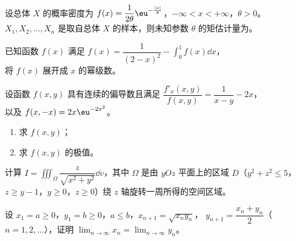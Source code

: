 \begin{question}[index=16]
设总体 $X$ 的概率密度为 $f(x)=\dfrac{1}{2\theta}\eu^{-\frac{|x|}{\theta}}$，$-\infty<x<+\infty$，$\theta>0$。
$X_1,X_2,\ldots,X_n$ 是取自总体 $X$ 的样本，则未知参数 $\theta$ 的矩估计量为\fillin。
\end{question}

\solveheading

\begin{question}[index=17,points=10,show-points=true,points-prelabel={（本题满分},points-postlabel={分）},points-separate-par=false]
已知函数 $f(x)$ 满足 $f(x)=\dfrac{1}{(2-x)^2}-\displaystyle\int_0^1 f(x)\dd x$，\\
将 $f(x)$ 展开成 $x$ 的幂级数。
\end{question}

\begin{question}[index=18,points=12,show-points=true,points-prelabel={（本题满分},points-postlabel={分）},points-separate-par=false]
设函数 $f(x,y)$ 具有连续的偏导数且满足 $\dfrac{f'_x(x,y)}{f(x,y)}=\dfrac{1}{x-y}-2x$，\\
以及 $f(x,-x)=2x\eu^{-2x^2}$。
\begin{enumerate}[label=（\Roman*）,leftmargin=2.6em,labelsep=.4em,itemsep=3pt,topsep=3pt]
\item 求 $f(x,y)$；
\item 求 $f(x,y)$ 的极值。
\end{enumerate}
\end{question}

\begin{question}[index=19,points=12,show-points=true,points-prelabel={（本题满分},points-postlabel={分）},points-separate-par=false]
计算 $I=\displaystyle\iiint_{\Omega}\dfrac{z}{\sqrt{x^2+y^2}}\dd v$，其中 $\Omega$ 是由 $yOz$ 平面上的区域 $D$（$y^2+z^2\le 5$，$z\ge y-1$，$y\ge 0$，$z\ge 0$）绕 $z$ 轴旋转一周所得的空间区域。
\end{question}

\begin{question}[index=20,points=12,show-points=true,points-prelabel={（本题满分},points-postlabel={分）},points-separate-par=false]
设 $x_1=a\ge 0$，$y_1=b\ge 0$，$a\le b$，$x_{n+1}=\sqrt{x_ny_n}$，
$y_{n+1}=\dfrac{x_n+y_n}{2}$（$n=1,2,\ldots$），证明 $\displaystyle\lim_{n\to\infty}x_n=\lim_{n\to\infty}y_n$。
\end{question}

